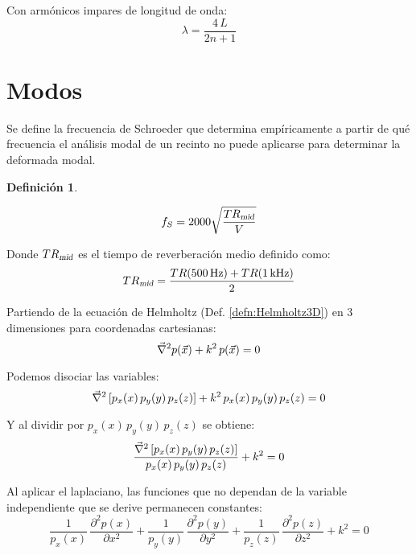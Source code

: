 \documentclass[a5paper,12pt,twoside]{book}
\newtheorem{defn}{{Definición}}[chapter]
\begin{document}
Con armónicos impares de longitud de onda:
\begin{equation}
    \lambda = \frac{4 \, L}{2n + 1}
\end{equation}


\section{Modos}

Se define la frecuencia de Schroeder que determina empíricamente a partir de qué frecuencia el análisis modal de un recinto no puede aplicarse para determinar la deformada modal.

\begin{mdframed}[style=MyFrame1]
    \begin{defn}
    \end{defn}
    \begin{equation*}
        f_S = 2000 \sqrt{\frac{{{TR}_\textsl{{mid}}}}{V}}
    \end{equation*}
\end{mdframed}

Donde ${{TR}_\textsl{{mid}}}$ es el tiempo de reverberación medio definido como:
\begin{equation*}
    {{TR}_\textsl{{mid}}} = \frac{TR(500\,\si{\hertz})+TR(1\,\si{\kilo\hertz})}{2}
\end{equation*}

Partiendo de la ecuación de Helmholtz (Def. \ref{defn:Helmholtz3D}) en 3 dimensiones para coordenadas cartesianas:
\begin{equation*}
    \Vec{\nabla}^2 p(\Vec{x}) + k^2 \, p(\Vec{x}) = 0
\end{equation*}

Podemos disociar las variables:
\begin{equation*}
    \Vec{\nabla}^2 \left[ p_x(x) \, p_y(y) \, p_z(z) \right] + k^2 \, p_x(x) \, p_y(y) \, p_z(z) = 0
\end{equation*}

Y al dividir por $p_x(x) \, p_y(y) \, p_z(z)$ se obtiene:
\begin{equation*}
    \frac{\Vec{\nabla}^2 \left[ p_x(x) \, p_y(y) \, p_z(z) \right]}{p_x(x) \, p_y(y) \, p_z(z)} + k^2 = 0
\end{equation*}

Al aplicar el laplaciano, las funciones que no dependan de la variable independiente que se derive permanecen constantes:
\begin{equation}
    \frac{1}{p_x(x)} \, \frac{\partial^2 p(x)}{\partial x^2}
    + \frac{1}{p_y(y)} \, \frac{\partial^2 p(y)}{\partial y^2}
    + \frac{1}{p_z(z)} \, \frac{\partial^2 p(z)}{\partial z^2}
    + k^2 = 0
    \label{eqn:modesHelmholtz}
\end{equation}
\end{document}
